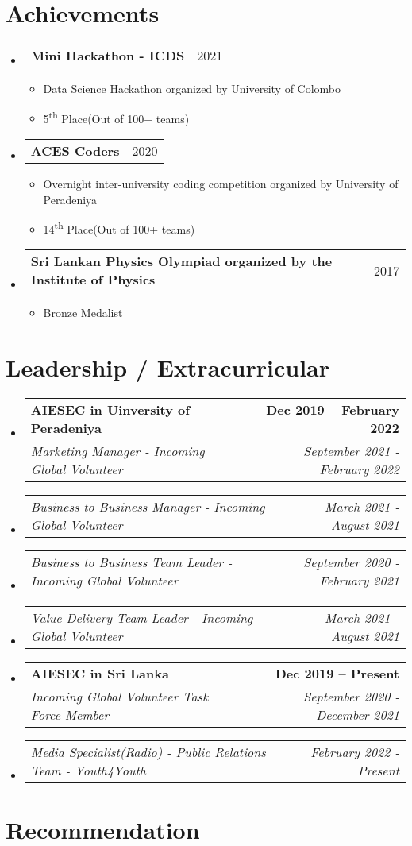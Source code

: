 \documentclass[letterpaper,11pt]{article}
\makeatletter
\newcommand{\resumeSubheading}[4]{
  \vspace{-2pt}\item
    \begin{tabular*}{1.0\textwidth}[t]{l@{\extracolsep{\fill}}r}
      \textbf{#1} & \textbf{\small #2} \\
      \textit{\small#3} & \textit{\small #4} \\
    \end{tabular*}\vspace{-7pt}
}
\newcommand{\resumeSubSubheading}[2]{
    \item
    \begin{tabular*}{1\textwidth}{l@{\extracolsep{\fill}}r}
      \textit{\small#1} & \textit{\small #2} \\
    \end{tabular*}\vspace{-7pt}
}
\newcommand{\resumeListHeading}[2]{
    \item
    \begin{tabular*}{1.001\textwidth}{l@{\extracolsep{\fill}}r}
      \small#1 & {\small #2}\\
    \end{tabular*}\vspace{-15pt}
}
\newcommand{\resumeSubHeadingListStart}{\begin{itemize}[leftmargin=0.0in, label={}]}
\newcommand{\resumeSubHeadingListEnd}{\end{itemize}}
\makeatother
\begin{document}
\section{Achievements}
    \resumeSubHeadingListStart
        \resumeListHeading{ \textbf{Mini Hackathon - ICDS} }{2021}
        \vspace*{3.0\multicolsep}
        \begin{itemize}[ itemsep=-2pt]
          \item Data Science Hackathon organized by University of Colombo
          \item 5\textsuperscript{th} Place(Out of 100+ teams)
        \end{itemize}
        \vspace{-20pt}
        \resumeListHeading{ \textbf{ACES Coders} }{2020}
        \vspace*{3.0\multicolsep}
        \begin{itemize}[ itemsep=-2pt]
          \item Overnight inter-university coding competition organized by University of Peradeniya
          \item 14\textsuperscript{th} Place(Out of 100+ teams)
        \end{itemize}
        \vspace{-20pt}
        \resumeListHeading{ \textbf{Sri Lankan Physics Olympiad organized by the Institute of Physics} }{2017}
        \vspace*{3.0\multicolsep}
        \begin{itemize}[ itemsep=-2pt]
          \item Bronze Medalist
        \end{itemize}
        
    \resumeSubHeadingListEnd
\vspace{-13pt}

\section{Leadership / Extracurricular}
    \resumeSubHeadingListStart
        \resumeSubheading{AIESEC in Uinversity of Peradeniya}{Dec 2019 -- February 2022}{Marketing Manager - Incoming Global Volunteer}{September 2021 - February 2022}
        \resumeSubSubheading{Business to Business Manager - Incoming Global Volunteer}{March 2021 - August 2021}
        \resumeSubSubheading{Business to Business Team Leader - Incoming Global Volunteer}{September 2020 - February 2021}
        \resumeSubSubheading{Value Delivery Team Leader - Incoming Global Volunteer}{March 2021 - August 2021}
        \resumeSubheading{AIESEC in Sri Lanka}{Dec 2019 -- Present}{Incoming Global Volunteer Task Force Member}{September 2020 - December 2021}
        \resumeSubSubheading{Media Specialist(Radio) - Public Relations Team - Youth4Youth}{February 2022 - Present}
    \resumeSubHeadingListEnd
    
\section{Recommendation}
\end{document}
